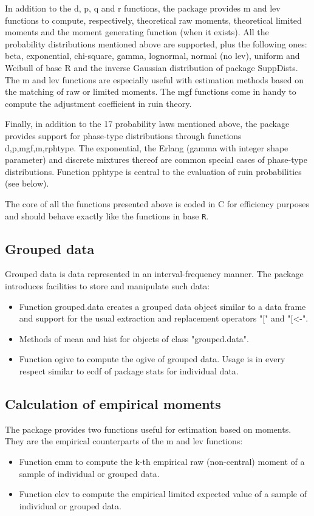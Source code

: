 \documentclass[12pt]{article}
\begin{document}
In addition to the d, p, q and r functions, the package provides m and lev functions to compute, respectively, theoretical raw moments, theoretical limited moments and the moment generating function (when it exists). All the probability distributions mentioned above are supported, plus the following ones: beta, exponential, chi-square, gamma, lognormal, normal (no lev), uniform and Weibull of base R and the inverse Gaussian distribution of package SuppDists. The m and lev functions are especially useful with estimation methods based on the matching of raw or limited moments. The mgf functions come in handy to compute the adjustment coefficient in ruin theory.

Finally, in addition to the 17 probability laws mentioned above, the package provides support for phase-type distributions through functions {d,p,mgf,m,r}phtype. The exponential, the Erlang (gamma with integer shape parameter) and discrete mixtures thereof are common special cases of phase-type distributions. Function pphtype is central to the evaluation of ruin probabilities (see below).

The core of all the functions presented above is coded in C for efficiency purposes and should behave exactly like the functions in base \texttt{R}.

\subsection{Grouped data}

Grouped data is data represented in an interval-frequency manner. The package introduces facilities to store and manipulate such data:
\begin{itemize}
\item Function grouped.data creates a grouped data object similar to a data frame and support for the usual extraction and replacement operators "[" and "[<-".
\item Methods of mean and hist for objects of class "grouped.data".
\item Function ogive to compute the ogive of grouped data. Usage is in every respect similar to ecdf of package stats for individual data.
\end{itemize}

\subsection{Calculation of empirical moments}

The package provides two functions useful for estimation based on moments. They are the empirical counterparts of the m and lev functions:
\begin{itemize}
\item Function emm to compute the k-th empirical raw (non-central) moment of a sample of individual or grouped data.
\item Function elev to compute the empirical limited expected value of a sample of individual or grouped data.
\end{itemize}
\end{document}
